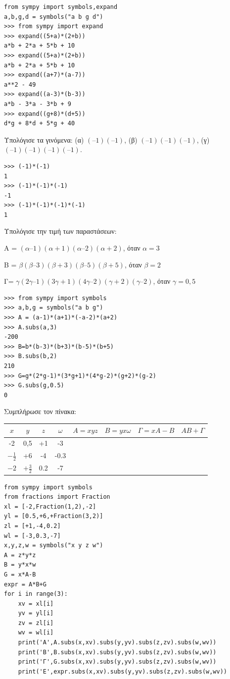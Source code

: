 \begin{lstlisting}
from sympy import symbols,expand
a,b,g,d = symbols("a b g d")
>>> from sympy import expand
>>> expand((5+a)*(2+b))
a*b + 2*a + 5*b + 10
>>> expand((5+a)*(2+b))
a*b + 2*a + 5*b + 10
>>> expand((a+7)*(a-7))
a**2 - 49
>>> expand((a-3)*(b-3))
a*b - 3*a - 3*b + 9
>>> expand((g+8)*(d+5))
d*g + 8*d + 5*g + 40
\end{lstlisting}
\begin{exercise}
Υπολόγισε	τα	γινόμενα:	(α)	$(–1)(–1)$,		(β)	$(–1)(–1)(–1)$,		(γ)	$(–1)(–1)(–1)(–1)$.
\end{exercise}
\begin{lstlisting}
>>> (-1)*(-1)
1
>>> (-1)*(-1)*(-1)
-1
>>> (-1)*(-1)*(-1)*(-1)
1
\end{lstlisting}
\begin{exercise}
Υπολόγισε	την	τιμή	των	παραστάσεων:

A	=	$(\alpha–1)(\alpha+1)(\alpha–2)(\alpha+2)$,		 	 όταν	$\alpha	=	3$

B	=	$\beta(\beta–3)(\beta+3)(\beta–5)(\beta+5)$,		 	 όταν	$\beta	=	2$

Γ=	$\gamma(2\gamma–1)(3\gamma+1)(4\gamma–2)(\gamma+2)(\gamma–2)$,		 όταν	$\gamma=0,5$

\end{exercise}
\begin{lstlisting}
>>> from sympy import symbols
>>> a,b,g = symbols("a b g")
>>> A = (a-1)*(a+1)*(-a-2)*(a+2)
>>> A.subs(a,3)
-200
>>> B=b*(b-3)*(b+3)*(b-5)*(b+5)
>>> B.subs(b,2)
210
>>> G=g*(2*g-1)*(3*g+1)*(4*g-2)*(g+2)*(g-2)
>>> G.subs(g,0.5)
0
\end{lstlisting}
\begin{exercise}
Συμπλήρωσε	τον	πίνακα:
\begin{table}[h]
\begin{tabular}{|c|c|c|c|c|c|c|c|}
$x$&$y$&$z$&$\omega$&$A=xyz$&$B=yx\omega$&$\Gamma=xA-B$&$AB+\Gamma$\\\hline
-2& 0,5& +1& -3&&&&\\\hline
$-\frac{1}{2}$&+6&-4&-0.3&&&&\\\hline
$-2$&$+\frac{3}{2}$&0.2&-7&&&&\\\hline
\end{tabular}
\end{table}
\end{exercise}
\begin{lstlisting}
from sympy import symbols
from fractions import Fraction
xl = [-2,Fraction(1,2),-2]
yl = [0.5,+6,+Fraction(3,2)]
zl = [+1,-4,0.2]
wl = [-3,0.3,-7]
x,y,z,w = symbols("x y z w")
A = z*y*z
B = y*x*w
G = x*A-B
expr = A*B+G
for i in range(3):
    xv = xl[i]
    yv = yl[i]
    zv = zl[i]
    wv = wl[i]
    print('A',A.subs(x,xv).subs(y,yv).subs(z,zv).subs(w,wv))
    print('B',B.subs(x,xv).subs(y,yv).subs(z,zv).subs(w,wv))
    print('Γ',G.subs(x,xv).subs(y,yv).subs(z,zv).subs(w,wv))
    print('Ε',expr.subs(x,xv).subs(y,yv).subs(z,zv).subs(w,wv))
\end{lstlisting}
